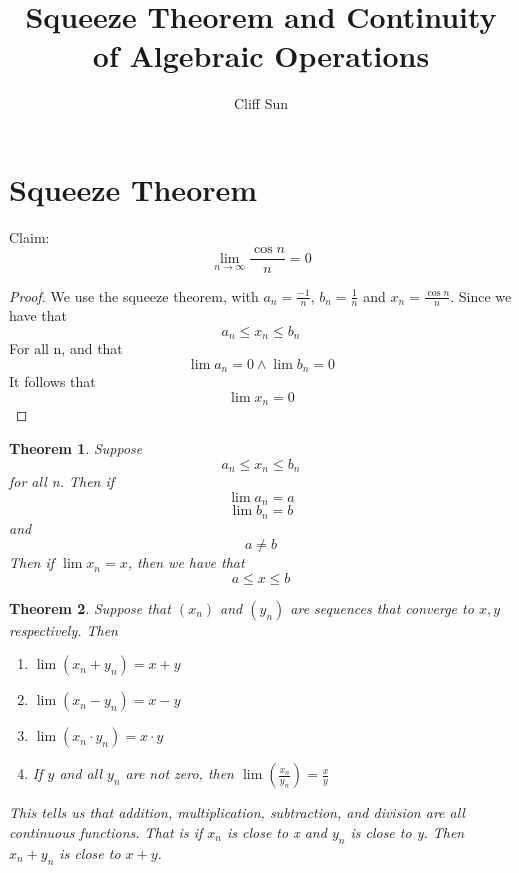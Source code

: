 \documentclass{article}
\title{Squeeze Theorem and Continuity of Algebraic Operations}
\author{Cliff Sun}
\newtheorem{theorem}{Theorem}[section]
\newtheorem{one minute paper}[theorem]{One Minute Paper}
\begin{document}
\maketitle

\section*{Squeeze Theorem}

Claim:
\begin{equation}
    \lim_{n\rightarrow\infty}\frac{\cos n}{n} = 0
\end{equation}

\begin{proof}
    We use the squeeze theorem, with $a_n = \frac{-1}{n}$, $b_n = \frac{1}{n}$ and $x_n = \frac{\cos n}{n}$. Since we have that
    \begin{equation}
        a_n \leq x_n \leq b_n
    \end{equation}
    For all n, and that
    \begin{equation}
        \lim a_n = 0 \land \lim b_n = 0
    \end{equation}
    It follows that
    \begin{equation}
        \lim x_n = 0
    \end{equation}
\end{proof}

\begin{theorem}
    Suppose
    \begin{equation}
        a_n \leq x_n \leq b_n
    \end{equation}
    for all n. Then if
    \begin{equation}
        \lim a_n = a
    \end{equation}
    \begin{equation}
        \lim b_n = b
    \end{equation}
    and
    \begin{equation}
        a \neq b
    \end{equation}
    Then if $\lim x_n = x$, then we have that 
    \begin{equation}
        a \leq x \leq b
    \end{equation}
\end{theorem}

\begin{theorem}
    Suppose that $(x_n)$ and $(y_n)$ are sequences that converge to $x, y$ respectively. Then
    \begin{enumerate}
        \item $\lim (x_n + y_n) = x + y$
        \item $\lim (x_n - y_n) = x - y$
        \item $\lim (x_n \cdot y_n) = x \cdot y$
        \item If $y$ and all $y_n$ are not zero, then $\lim (\frac{x_n}{y_n}) = \frac{x}{y}$
    \end{enumerate}
    This tells us that addition, multiplication, subtraction, and division are all continuous functions. That is if $x_n$ is close to x and $y_n$ is close to y.
    Then $x_n + y_n$ is close to $x + y$. 
\end{theorem}
\end{document}
